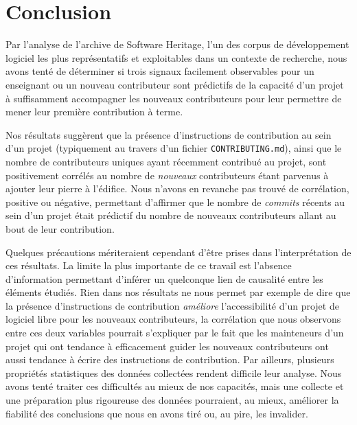 \documentclass[dvipsnames,runningheads]{llncs}
\newcommand{\en}[1]{\foreignlanguage{english}{\emph{#1}}}
\begin{document}
    \section{Conclusion}

    Par l'analyse de l'archive de Software Heritage, l'un des corpus de développement logiciel les plus
    représentatifs et exploitables dans un contexte de recherche, nous avons tenté de déterminer si trois
    signaux facilement observables pour un enseignant ou un nouveau contributeur sont prédictifs de la
    capacité d'un projet à suffisamment accompagner les nouveaux contributeurs pour leur permettre de mener
    leur première contribution à terme.

    Nos résultats suggèrent que la présence d'instructions de contribution au sein d'un projet (typiquement au
    travers d'un fichier \texttt{CONTRIBUTING.md}), ainsi que le nombre de contributeurs uniques ayant
    récemment contribué au projet, sont positivement corrélés au nombre de \emph{nouveaux} contributeurs étant
    parvenus à ajouter leur pierre à l'édifice. Nous n'avons en revanche pas trouvé de corrélation, positive
    ou négative, permettant d'affirmer que le nombre de \en{commits} récents au sein d'un projet était
    prédictif du nombre de nouveaux contributeurs allant au bout de leur contribution.

    Quelques précautions mériteraient cependant d'être prises dans l'interprétation de ces résultats. La
    limite la plus importante de ce travail est l'absence d'information permettant d'inférer un quelconque
    lien de causalité entre les éléments étudiés. Rien dans nos résultats ne nous permet par exemple de dire
    que la présence d'instructions de contribution \emph{améliore} l'accessibilité d'un projet de logiciel
    libre pour les nouveaux contributeurs, la corrélation que nous observons entre ces deux variables pourrait
    s'expliquer par le fait que les mainteneurs d'un projet qui ont tendance à efficacement guider les
    nouveaux contributeurs ont aussi tendance à écrire des instructions de contribution. Par ailleurs,
    plusieurs propriétés statistiques des données collectées rendent difficile leur analyse. Nous avons tenté
    traiter ces difficultés au mieux de nos capacités, mais une collecte et une préparation plus rigoureuse
    des données pourraient, au mieux, améliorer la fiabilité des conclusions que nous en avons tiré ou, au
    pire, les invalider.
\end{document}
